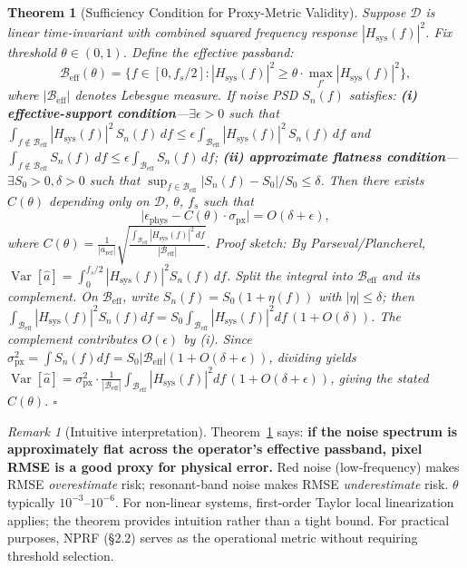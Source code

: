 \documentclass[9pt,twocolumn]{article}
\newtheorem{theorem}[proposition]{Theorem}
\theoremstyle{remark}
\newtheorem{remark}[proposition]{Remark}
\theoremstyle{definition}
\newcommand{\pxrmse}{\sigma_{\text{px}}}
\newcommand{\physerr}{\epsilon_{\text{phys}}}
\newcommand{\snf}{S_n(f)}
\newcommand{\hsysf}{|H_{\text{sys}}(f)|^2}
\newcommand{\Beff}{\mathcal{B}_{\text{eff}}}
\begin{document}
\begin{theorem}[Sufficiency Condition for Proxy-Metric Validity]
\label{thm:sufficiency}
Suppose $\mathcal{D}$ is linear time-invariant with combined squared frequency response $\hsysf$. Fix threshold $\theta \in (0,1)$. Define the \textit{effective passband}:
\begin{equation}
\label{eq:band}
\Beff(\theta) = \bigl\{f \in [0, f_s/2] : \hsysf \geq \theta \cdot \max_{f'} \hsysf \bigr\},
\end{equation}
where $|\Beff|$ denotes Lebesgue measure. If noise PSD $\snf$ satisfies: \textbf{(i) effective-support condition}---$\exists \epsilon>0$ such that $\int_{f \notin \Beff} \hsysf \,\snf \, df \leq \epsilon \int_{\Beff} \hsysf \,\snf \, df$ and $\int_{f \notin \Beff} \snf \, df \leq \epsilon \int_{\Beff} \snf \, df$; \textbf{(ii) approximate flatness condition}---$\exists S_0>0, \delta>0$ such that $\sup_{f \in \Beff} |\snf - S_0|/S_0 \leq \delta$. Then there exists $C(\theta)$ depending only on $\mathcal{D}$, $\theta$, $f_s$ such that
\begin{equation}
\label{eq:thm_bound}
\bigl|\physerr - C(\theta) \cdot \pxrmse \bigr| = O(\delta + \epsilon),
\end{equation}
where $C(\theta) = \frac{1}{|a_{\text{ref}}|} \sqrt{\frac{\int_{\Beff} \hsysf \, df}{|\Beff|}}$. \textit{Proof sketch:} By Parseval/Plancherel, $\operatorname{Var}[\hat{a}] = \int_0^{f_s/2} \hsysf \snf \,df$. Split the integral into $\Beff$ and its complement. On $\Beff$, write $\snf = S_0(1+\eta(f))$ with $|\eta|\le\delta$; then $\int_{\Beff}\hsysf\snf df = S_0\int_{\Beff}\hsysf df\,(1+O(\delta))$. The complement contributes $O(\epsilon)$ by (i). Since $\pxrmse^2 = \int \snf df = S_0|\Beff|(1+O(\delta+\epsilon))$, dividing yields $\operatorname{Var}[\hat{a}] = \pxrmse^2 \cdot \frac{1}{|\Beff|}\int_{\Beff}\hsysf df \,(1+O(\delta+\epsilon))$, giving the stated $C(\theta)$. $\square$
\end{theorem}

\begin{remark}[Intuitive interpretation]
Theorem~\ref{thm:sufficiency} says: \textbf{if the noise spectrum is approximately flat across the operator's effective passband, pixel RMSE is a good proxy for physical error.} Red noise (low-frequency) makes RMSE \textit{overestimate} risk; resonant-band noise makes RMSE \textit{underestimate} risk. $\theta$ typically $10^{-3}$--$10^{-6}$. For non-linear systems, first-order Taylor local linearization applies; the theorem provides intuition rather than a tight bound. For practical purposes, NPRF (\S 2.2) serves as the operational metric without requiring threshold selection.
\end{remark}
\end{document}
